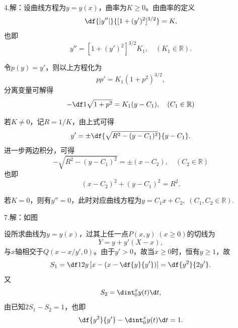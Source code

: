 \bigskip

4.\;解：设曲线方程为$y=y(x)$，曲率为$K\geq0$。由曲率的定义
$$\df{|y''|}{[1+(y')^2]^{3/2}}=K,$$
也即
$$y''=[1+(y')^2]^{3/2}K_1,\quad(K_1\in\mathbb{R}).$$

令$p(y)=y'$，则以上方程化为
$$pp'=K_1(1+p^2)^{3/2},$$
分离变量可解得
$$-\df1{\sqrt{1+p^2}}=K_1(y-C_1),\quad(C_1\in\mathbb{R})$$

若$K\ne 0$，记$R=1/K$，由上式可得
$$y'=\pm\df{\sqrt{R^2-(y-C_1)^2}}{y-C_1}.$$
进一步两边积分，可得
$$-\sqrt{R^2-(y-C_1)^2}=\pm(x-C_2),\quad(C_2\in\mathbb{R})$$
也即
$$(x-C_2)^2+(y-C_1)^2=R^2.$$

若$K=0$，则有$y''=0$，此时对应曲线方程为$y=C_1x+C_2,\;(C_1,C_2\in\mathbb{R})$.

\bigskip

7.\;解：如图
\begin{center}
\end{center}
设所求曲线为$y=y(x)$，过其上任一点$P(x,y)\;(x\geq 0)$的切线为
$$Y=y+y'(X-x),$$
与$x$轴相交于$Q(x-x/y',0)$。由于$y'>0$，故当$x\geq 0$时，恒有$y\geq 1$，故
$$S_1=\df12y\left[x-\left(x-\df{y}{y'}\right)\right]=\df{y^2}{2y'}.$$
又
$$S_2=\dint_0^xy(t)\d t,$$
由已知$2S_1-S_2=1$，也即
$$\df{y^2}{y'}-\dint_0^xy(t)\d t=1.$$

